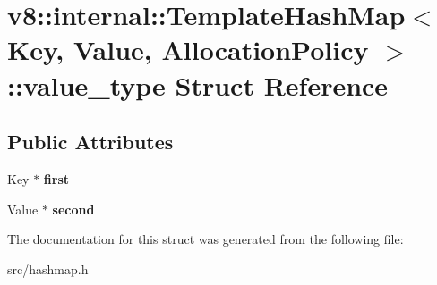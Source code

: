 \hypertarget{structv8_1_1internal_1_1_template_hash_map_1_1value__type}{}\section{v8\+:\+:internal\+:\+:Template\+Hash\+Map$<$ Key, Value, Allocation\+Policy $>$\+:\+:value\+\_\+type Struct Reference}
\label{structv8_1_1internal_1_1_template_hash_map_1_1value__type}
\subsection*{Public Attributes}
\begin{DoxyCompactItemize}
\item 
\hypertarget{structv8_1_1internal_1_1_template_hash_map_1_1value__type_a9d5aa42edfb80e2f406f97288c696485}{}Key $\ast$ {\bfseries first}\label{structv8_1_1internal_1_1_template_hash_map_1_1value__type_a9d5aa42edfb80e2f406f97288c696485}

\item 
\hypertarget{structv8_1_1internal_1_1_template_hash_map_1_1value__type_af9c5556de500f8c903f1c22909390728}{}Value $\ast$ {\bfseries second}\label{structv8_1_1internal_1_1_template_hash_map_1_1value__type_af9c5556de500f8c903f1c22909390728}

\end{DoxyCompactItemize}


The documentation for this struct was generated from the following file\+:\begin{DoxyCompactItemize}
\item 
src/hashmap.\+h\end{DoxyCompactItemize}
